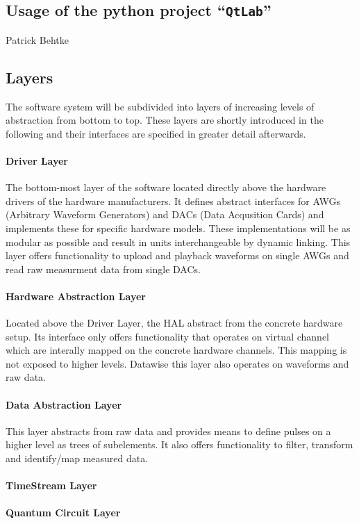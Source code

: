\documentclass[a4paper,12pt]{article}
\begin{document}
\subsection{Usage of the python project ``\texttt{QtLab}''}
Patrick Behtke 

\subsection{Layers}
The software system will be subdivided into layers of increasing levels of abstraction from bottom to top. These layers are shortly introduced in the following and their interfaces are specified in greater detail afterwards.
\paragraph{Driver Layer} The bottom-most layer of the software located directly above the hardware drivers of the hardware manufacturers. It defines abstract interfaces for AWGs (Arbitrary Waveform Generators) and DACs (Data Acqusition Cards) and implements these for specific hardware models. These implementations will be as modular as possible and result in units interchangeable by dynamic linking. This layer offers functionality to upload and playback waveforms on single AWGs and read raw measurment data from single DACs.
\paragraph{Hardware Abstraction Layer} Located above the Driver Layer, the HAL abstract from the concrete hardware setup. Its interface only offers functionality that operates on virtual channel which are interally mapped on the concrete hardware channels. This mapping is not exposed to higher levels. Datawise this layer also operates on waveforms and raw data.
\paragraph{Data Abstraction Layer} This layer abstracts from raw data and provides means to define pulses on a higher level as trees of subelements. It also offers functionality to filter, transform and identify/map measured data.
\paragraph{TimeStream Layer}
\paragraph{Quantum Circuit Layer}
\end{document}
